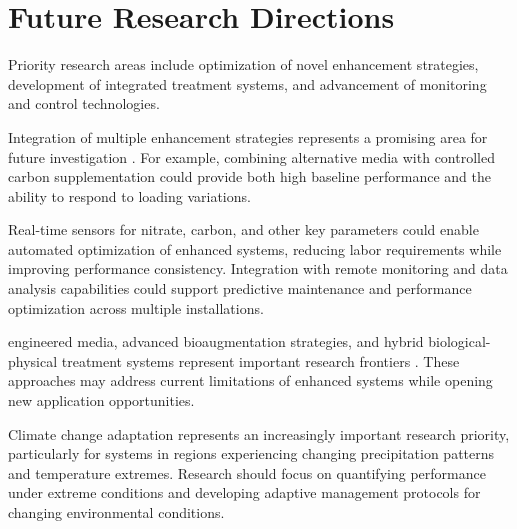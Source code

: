 \documentclass[12pt,a4paper]{article}
\begin{document}
\section{Future Research Directions}

 Priority research areas include optimization of novel enhancement strategies, development of integrated treatment systems, and advancement of monitoring and control technologies.

Integration of multiple enhancement strategies represents a promising area for future investigation \citep{RN242, RN258, RN196}.  For example, combining alternative media with controlled carbon supplementation could provide both high baseline performance and the ability to respond to loading variations.

 Real-time sensors for nitrate, carbon, and other key parameters could enable automated optimization of enhanced systems, reducing labor requirements while improving performance consistency. Integration with remote monitoring and data analysis capabilities could support predictive maintenance and performance optimization across multiple installations.

 engineered media, advanced bioaugmentation strategies, and hybrid biological-physical treatment systems represent important research frontiers \citep{RN370, RN291}. These approaches may address current limitations of enhanced systems while opening new application opportunities.

Climate change adaptation represents an increasingly important research priority, particularly for systems in regions experiencing changing precipitation patterns and temperature extremes.  Research should focus on quantifying performance under extreme conditions and developing adaptive management protocols for changing environmental conditions.
\end{document}
